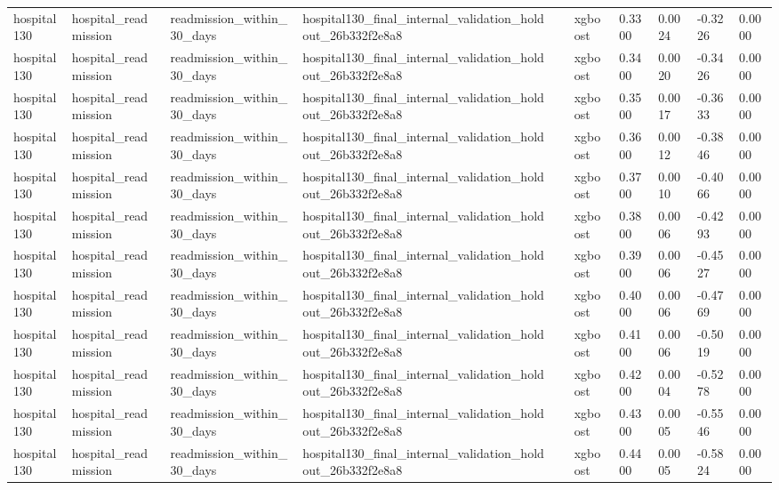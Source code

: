 \begin{tabular}{llllllllll}
hospital130 & hospital\_readmission & readmission\_within\_30\_days & hospital130\_final\_internal\_validation\_holdout\_26b332f2e8a8 &  & xgboost & 0.3300 & 0.0024 & -0.3226 & 0.0000 \\
hospital130 & hospital\_readmission & readmission\_within\_30\_days & hospital130\_final\_internal\_validation\_holdout\_26b332f2e8a8 &  & xgboost & 0.3400 & 0.0020 & -0.3426 & 0.0000 \\
hospital130 & hospital\_readmission & readmission\_within\_30\_days & hospital130\_final\_internal\_validation\_holdout\_26b332f2e8a8 &  & xgboost & 0.3500 & 0.0017 & -0.3633 & 0.0000 \\
hospital130 & hospital\_readmission & readmission\_within\_30\_days & hospital130\_final\_internal\_validation\_holdout\_26b332f2e8a8 &  & xgboost & 0.3600 & 0.0012 & -0.3846 & 0.0000 \\
hospital130 & hospital\_readmission & readmission\_within\_30\_days & hospital130\_final\_internal\_validation\_holdout\_26b332f2e8a8 &  & xgboost & 0.3700 & 0.0010 & -0.4066 & 0.0000 \\
hospital130 & hospital\_readmission & readmission\_within\_30\_days & hospital130\_final\_internal\_validation\_holdout\_26b332f2e8a8 &  & xgboost & 0.3800 & 0.0006 & -0.4293 & 0.0000 \\
hospital130 & hospital\_readmission & readmission\_within\_30\_days & hospital130\_final\_internal\_validation\_holdout\_26b332f2e8a8 &  & xgboost & 0.3900 & 0.0006 & -0.4527 & 0.0000 \\
hospital130 & hospital\_readmission & readmission\_within\_30\_days & hospital130\_final\_internal\_validation\_holdout\_26b332f2e8a8 &  & xgboost & 0.4000 & 0.0006 & -0.4769 & 0.0000 \\
hospital130 & hospital\_readmission & readmission\_within\_30\_days & hospital130\_final\_internal\_validation\_holdout\_26b332f2e8a8 &  & xgboost & 0.4100 & 0.0006 & -0.5019 & 0.0000 \\
hospital130 & hospital\_readmission & readmission\_within\_30\_days & hospital130\_final\_internal\_validation\_holdout\_26b332f2e8a8 &  & xgboost & 0.4200 & 0.0004 & -0.5278 & 0.0000 \\
hospital130 & hospital\_readmission & readmission\_within\_30\_days & hospital130\_final\_internal\_validation\_holdout\_26b332f2e8a8 &  & xgboost & 0.4300 & 0.0005 & -0.5546 & 0.0000 \\
hospital130 & hospital\_readmission & readmission\_within\_30\_days & hospital130\_final\_internal\_validation\_holdout\_26b332f2e8a8 &  & xgboost & 0.4400 & 0.0005 & -0.5824 & 0.0000 \\

\end{tabular}
